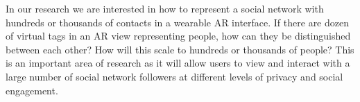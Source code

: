 In our research we are interested in how to represent a social network with hundreds or thousands of contacts in a wearable AR interface. If there are dozen of virtual tags in an AR view representing people, how can they be distinguished between each other? How will this scale to hundreds or thousands of people? This is an important area of research as it will allow users to view and interact with a large number of social network followers at different levels of privacy and social engagement.







